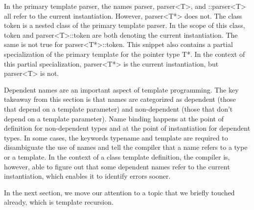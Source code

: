 In the primary template parser, the names parser, parser<T>, and ::parser<T> all refer to the current instantiation. However, parser<T*> does not. The class token is a nested class of the primary template parser. In the scope of this class, token and parser<T>::token are both denoting the current instantiation. The same is not true for parser<T*>::token. This snippet also contains a partial specialization of the primary template for the pointer type T*. In the context of this partial specialization, parser<T*> is the current instantiation, but parser<T> is not.

Dependent names are an important aspect of template programming. The key takeaway from this section is that names are categorized as dependent (those that depend on a template parameter) and non-dependent (those that don’t depend on a template parameter). Name binding happens at the point of definition for non-dependent types and at the point of instantiation for dependent types. In some cases, the keywords typename and template are required to disambiguate the use of names and tell the compiler that a name refers to a type or a template. In the context of a class template definition, the compiler is, however, able to figure out that some dependent names refer to the current instantiation, which enables it to identify errors sooner.

In the next section, we move our attention to a topic that we briefly touched already, which is template recursion.























